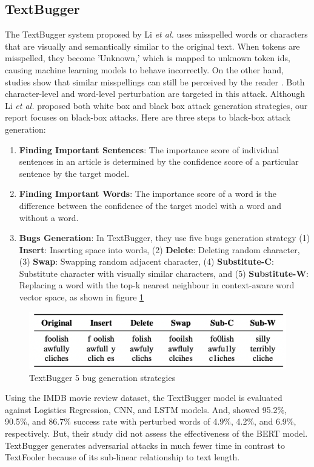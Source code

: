\documentclass[%
	BCOR=8mm, %
	DIV=12,
	toc=bibliography, %
	toc=listof, %
	oneside, %
	egregdoesnotlikesansseriftitles, %
	]{scrbook}
\begin{document}
\subsection{TextBugger}
\label{subsection:textbugger}
The TextBugger system proposed by Li \textit{et al.} \cite{li_textbugger_2019} uses misspelled words or characters that are visually and semantically similar to the original text. When tokens are misspelled, they become 'Unknown,' which is mapped to unknown token ids, causing machine learning models to behave incorrectly. On the other hand, studies show that similar misspellings can still be perceived by the reader \cite{rawlinson_significance_2007,alzantot_generating_2018}. Both character-level and word-level perturbation are targeted in this attack. Although Li \textit{et al.} \cite{li_textbugger_2019}  proposed both white box and black box attack generation strategies, our report focuses on black-box attacks. Here are three steps to black-box attack generation:
\begin{enumerate}
    \item \textbf{Finding Important Sentences}: The importance score of individual sentences in an article is determined by the confidence score of a particular sentence by the target model.
    \item \textbf{Finding Important Words}: The importance score of a word is the difference between the confidence of the target model with a word and without a word.
    \item \textbf{Bugs Generation}: In TextBugger, they use five bugs generation strategy (1) \textbf{Insert}: Inserting space into words, (2) \textbf{Delete}: Deleting random character,
    (3) \textbf{Swap}: Swapping random adjacent character, (4) \textbf{Substitute-C}: Substitute character with visually similar characters, and (5)\textbf{ Substitute-W}: Replacing a word with the top-k nearest neighbour in context-aware word vector space, as shown in figure \ref{diag:textbug}
\end{enumerate}

\begin{figure}[H]
    \centering
    \includegraphics[width=.7\textwidth]{img/textbugger_5strat.png}
    \caption[Example of 5 bug generation strategies of TextBugger]{TextBugger 5 bug generation strategies \cite{li_textbugger_2019} }
    \label{diag:textbug}
\end{figure}
Using the IMDB movie review dataset, the TextBugger model is evaluated against Logistics Regression, CNN, and LSTM  models. And, showed 95.2\%, 90.5\%, and 86.7\% success rate with perturbed words of 4.9\%, 4.2\%, and 6.9\%, respectively. But, their study did not assess the effectiveness of the BERT model. TextBugger generates adversarial attacks in much fewer time in contrast to TextFooler because of its sub-linear relationship to text length.
\end{document}
